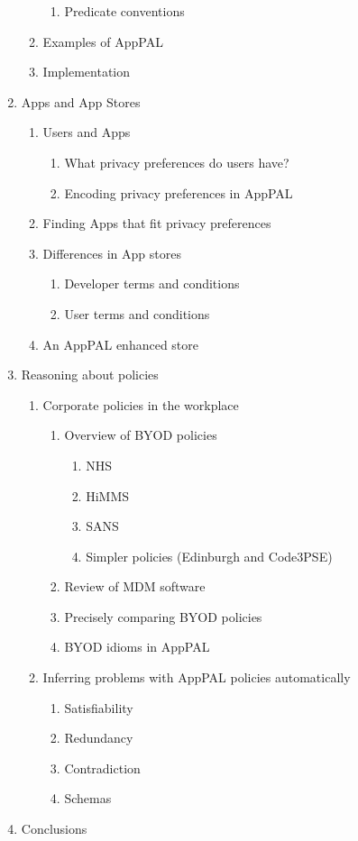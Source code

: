 \documentclass[a4paper]{scrartcl}
\begin{document}
\begin{enumerate}
\begin{enumerate}[3.1]
\begin{enumerate}[{3.2.}1]
    \item Predicate conventions
    \end{enumerate}
  \item Examples of AppPAL
  \item Implementation
  \end{enumerate}
\item Apps and App Stores
  \begin{enumerate}[4.1]
  \item Users and Apps
    \begin{enumerate}[{4.1.}1]
    \item What privacy preferences do users have?
    \item Encoding privacy preferences in AppPAL
    \end{enumerate}
  \item Finding Apps that fit privacy preferences
  \item Differences in App stores
    \begin{enumerate}[{4.3.}1]
    \item Developer terms and conditions
    \item User terms and conditions
    \end{enumerate}
  \item An AppPAL enhanced store
  \end{enumerate}
\item Reasoning about policies
  \begin{enumerate}[5.1]
  \item Corporate policies in the workplace
    \begin{enumerate}[{5.1.}1]
    \item Overview of BYOD policies 
      \begin{enumerate}[{5.1.1.}1]
      \item NHS
      \item HiMMS
      \item SANS
      \item Simpler policies (Edinburgh and Code3PSE)
      \end{enumerate}
    \item Review of MDM software
    \item Precisely comparing BYOD policies
    \item BYOD idioms in AppPAL
    \end{enumerate}
  \item Inferring problems with AppPAL policies automatically
    \begin{enumerate}[5.1.3]
    \item Satisfiability
    \item Redundancy
    \item Contradiction
    \item Schemas
    \end{enumerate}
  \end{enumerate}
\item Conclusions
\end{enumerate}
\pagebreak
\end{document}
